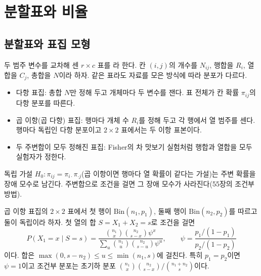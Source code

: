 \chapter{분할표와 비율}
\label{ch:contingency}


\section{분할표와 표집 모형}
\label{sec:sampling-models}

두 범주 변수를 교차해 센 $r\times c$ 표를 라 한다. 칸 $(i,j)$의 개수를 $N_{ij}$, 행합을 $R_i$, 열합을 $C_j$, 총합을 $N$이라 하자. 같은 표라도 자료를 모은 방식에 따라 분포가 다르다.
\begin{itemize}
\item 다항 표집: 총합 $N$만 정해 두고 개체마다 두 변수를 잰다. 표 전체가 칸 확률 $\pi_{ij}$의 다항 분포를 따른다.
\item 곱 이항(곱 다항) 표집: 행마다 개체 수 $R_i$를 정해 두고 각 행에서 열 범주를 센다. 행마다 독립인 다항 분포이고 $2\times2$ 표에서는 두 이항 표본이다.
\item 두 주변합이 모두 정해진 표집: Fisher의 차 맛보기 실험처럼 행합과 열합을 모두 실험자가 정한다.
\end{itemize}
독립 가설 $H_0:\pi_{ij}=\pi_{i\cdot}\pi_{\cdot j}$(곱 이항이면 행마다 열 확률이 같다는 가설)는 주변 확률을 장애 모수로 남긴다. 주변합으로 조건을 걸면 그 장애 모수가 사라진다(55장의 조건부 방법).

\begin{proposition}
\label{prop:hypergeometric}
곱 이항 표집의 $2\times2$ 표에서 첫 행이 $\mathrm{Bin}(n_1,p_1)$, 둘째 행이 $\mathrm{Bin}(n_2,p_2)$를 따르고 둘이 독립이라 하자. 첫 열의 합 $S=X_1+X_2=s$로 조건을 걸면
\[
P(X_1=x\mid S=s)=\frac{\binom{n_1}x\binom{n_2}{s-x}\psi^x}{\sum_u\binom{n_1}u\binom{n_2}{s-u}\psi^u},\qquad\psi=\frac{p_1/(1-p_1)}{p_2/(1-p_2)}
\]
이다. 합은 $\max(0,s-n_2)\le u\le\min(n_1,s)$에 걸친다. 특히 $p_1=p_2$이면 $\psi=1$이고 조건부 분포는 초기하 분포 $\binom{n_1}x\binom{n_2}{s-x}/\binom{n_1+n_2}s$이다.
\end{proposition}

